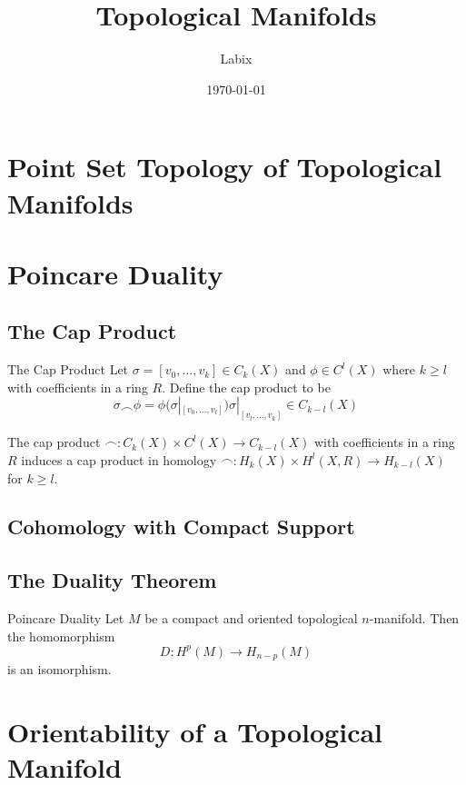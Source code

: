 \documentclass[a4paper]{article}
\title{Topological Manifolds}
\author{Labix}
\date{\today}
\begin{document}
\maketitle
\begin{abstract}
\end{abstract}
\pagebreak
\tableofcontents
\pagebreak

\section{Point Set Topology of Topological Manifolds}


\pagebreak
\section{Poincare Duality}
\subsection{The Cap Product}
\begin{defn}{The Cap Product}{} Let $\sigma=[v_0,\dots,v_k]\in C_k(X)$ and $\phi\in C^l(X)$ where $k\geq l$ with coefficients in a ring $R$. Define the cap product to be $$\sigma\frown\phi=\phi(\sigma|_{[v_0,\dots,v_l]})\sigma|_{[v_l,\dots,v_k]}\in C_{k-l}(X)$$
\end{defn}

\begin{lmm}{}{} The cap product $\frown: C_k(X)\times C^l(X)\to C_{k-l}(X)$ with coefficients in a ring $R$ induces a cap product in homology $\frown: H_k(X)\times H^l(X,R)\to H_{k-l}(X)$ for $k\geq l$. 
\end{lmm}

\subsection{Cohomology with Compact Support}

\subsection{The Duality Theorem}
\begin{thm}{Poincare Duality}{} Let $M$ be a compact and oriented topological $n$-manifold. Then the homomorphism $$D:H^p(M)\to H_{n-p}(M)$$ is an isomorphism. 
\end{thm}

\pagebreak
\section{Orientability of a Topological Manifold}
\end{document}
